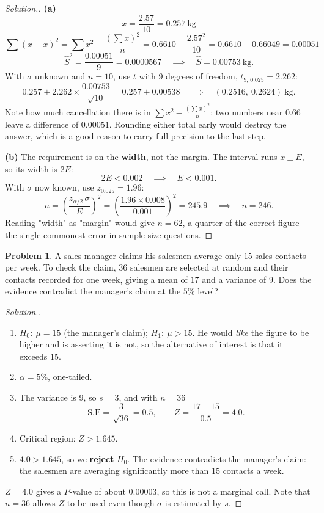 \documentclass[11pt,a4paper]{article}
\theoremstyle{definition}
\newtheorem{problemx}{Problem}[section]
\newenvironment{problem}{\begin{problemx}}{\end{problemx}}
\newenvironment{solution}
  {\renewcommand{\qedsymbol}{}\begin{proof}[\textit{Solution}.]}
  {\end{proof}}
\begin{document}
\begin{solution}
\textbf{(a)}
\[\overline{x}=\frac{2.57}{10}=0.257\ \text{kg}\]
\[\sum(x-\overline{x})^2=\sum x^2-\frac{(\sum x)^2}{n}=0.6610-\frac{2.57^2}{10}=0.6610-0.66049=0.00051\]
\[\widehat{S}^2=\frac{0.00051}{9}=0.0000567\quad\implies\quad \widehat{S}=0.00753\ \text{kg}.\]
With $\sigma$ unknown and $n=10$, use $t$ with $9$ degrees of freedom,
$t_{9,\,0.025}=2.262$:
\[0.257\pm 2.262\times\frac{0.00753}{\sqrt{10}}=0.257\pm 0.00538
\quad\implies\quad (0.2516,\ 0.2624)\ \text{kg}.\]
Note how much cancellation there is in $\sum x^2-\frac{(\sum x)^2}{n}$: two numbers near
$0.66$ leave a difference of $0.00051$. Rounding either total early would destroy the answer,
which is a good reason to carry full precision to the last step.

\textbf{(b)} The requirement is on the \textbf{width}, not the margin. The interval runs
$\overline{x}\pm E$, so its width is $2E$:
\[2E<0.002\quad\implies\quad E<0.001.\]
With $\sigma$ now known, use $z_{0.025}=1.96$:
\[n=\left(\frac{z_{\alpha/2}\,\sigma}{E}\right)^2=\left(\frac{1.96\times 0.008}{0.001}\right)^2=245.9
\quad\implies\quad n=246.\]
Reading "width" as "margin" would give $n=62$, a quarter of the correct figure --- the single
commonest error in sample-size questions.
\end{solution}

\begin{problem}
A sales manager claims his salesmen average only $15$ sales contacts per week. To check the
claim, $36$ salesmen are selected at random and their contacts recorded for one week, giving
a mean of $17$ and a variance of $9$. Does the evidence contradict the manager's claim at the
$5\%$ level?
\end{problem}

\begin{solution}
\begin{enumerate}
\item $H_0:\ \mu=15$ (the manager's claim); $H_1:\ \mu>15$. He would \emph{like} the figure
to be higher and is asserting it is not, so the alternative of interest is that it exceeds
$15$.
\item $\alpha=5\%$, one-tailed.
\item The variance is $9$, so $s=3$, and with $n=36$
\[\text{S.E}=\frac{3}{\sqrt{36}}=0.5,\qquad Z=\frac{17-15}{0.5}=4.0.\]
\item Critical region: $Z>1.645$.
\item $4.0>1.645$, so we \textbf{reject} $H_0$. The evidence contradicts the manager's claim:
the salesmen are averaging significantly more than $15$ contacts a week.
\end{enumerate}
$Z=4.0$ gives a $P$-value of about $0.00003$, so this is not a marginal call. Note that
$n=36$ allows $Z$ to be used even though $\sigma$ is estimated by $s$.
\end{solution}
\end{document}
